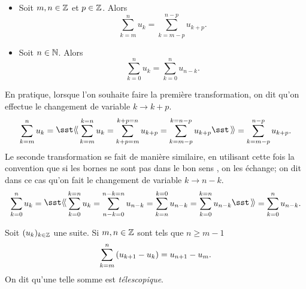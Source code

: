 \documentclass{magnolia}
\begin{document}
\begin{proposition}[utile=-3]
\begin{itemize}
\item Soit $m,n\in\mathbb{Z}$ et $p\in\mathbb{Z}$. Alors
  \[\sum_{k=m}^n u_k=\sum_{k=m-p}^{n-p} u_{k+p}.\]
\item Soit $n\in\mathbb{N}$. Alors
  \[\sum_{k=0}^n u_k=\sum_{k=0}^n u_{n-k}.\]
\end{itemize}
\end{proposition}

\begin{remarques}
\remarque En pratique, lorsque l'on souhaite faire la première transformation,
  on dit qu'on effectue le changement de variable $k\to k+p$.
  \[\sum_{k=m}^n u_k=\text{\og} \sum_{k=m}^{k=n} u_k=\sum_{k+p=m}^{k+p=n} u_{k+p}=
    \sum_{k=m-p}^{k=n-p} u_{k+p}\text{\fg}=\sum_{k=m-p}^{n-p} u_{k+p}.\]
  Le seconde transformation se fait de manière similaire, en utilisant cette fois la
  convention que si les bornes ne sont pas \og dans le bon sens \fg, on les échange; on
  dit dans ce cas qu'on fait le changement de variable $k\to n-k$.
  \[\sum_{k=0}^n u_k=\text{\og} \sum_{k=0}^{k=n} u_k=\sum_{n-k=0}^{n-k=n} u_{n-k}=
  \sum_{k=n}^{k=0} u_{n-k}=\sum_{k=0}^{k=n} u_{n-k}\text{\fg}=\sum_{k=0}^{n} u_{n-k}.\]

\remarque Soit $(u_k)_{k\in\mathbb{Z}}$ une suite. Si $m,n\in\mathbb{Z}$ sont tels que $n\geq m-1$
  \[\sum_{k=m}^n \left(u_{k+1} - u_k\right) = u_{n+1}-u_m.\]
  On dit qu'une telle somme est \emph{télescopique}.
\end{remarques}
\end{document}
